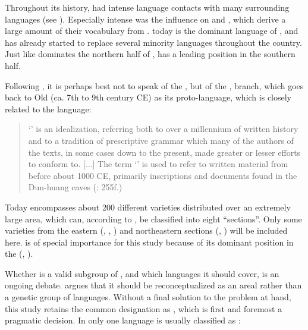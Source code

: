 Throughout its history,  had intense language contacts with many surrounding languages (see \citealt{Matthews2010}). Especially intense was the influence on  and , which derive a large amount of their vocabulary from .  today is the dominant language of , and has already started to replace several minority languages throughout the country. Just like  dominates the northern half of ,  has a leading position in the southern half.

Following \citet{Tournadre2014}, it is perhaps best not to speak of the , but of the , branch, which goes back to Old  (ca. 7th to 9th century CE) as its proto-language, which is closely related to the  language:

\begin{quote}
‘’ is an idealization, referring both to over a millennium of written history and to a tradition of prescriptive grammar which many of the authors of the texts, in some cases down to the present, made greater or lesser efforts to conform to. [...] The term ‘’ is used to refer to written material from before about 1000 CE, primarily inscriptions and documents found in the Dun-huang caves (\citealt{DeLancey2003}: 255f.)
\end{quote}

Today  encompasses about 200 different varieties distributed over an extremely large area, which can, according to \citet{Tournadre2005,Tournadre2005}, be classified into eight “sections”. Only some varieties from the eastern (, , ) and northeastern sections (, ) will be included here.  is of special importance for this study because of its dominant position in the  (\citealt{SandmanSimon2016}, ).

Whether  is a valid subgroup of , and which languages it should cover, is an ongoing debate. \citet{Chirkova2012} argues that it should be reconceptualized as an areal rather than a genetic group of  languages. Without a final solution to the problem at hand, this study retains the common designation as , which is first and foremost a pragmatic decision. In  only one language is usually classified as :

